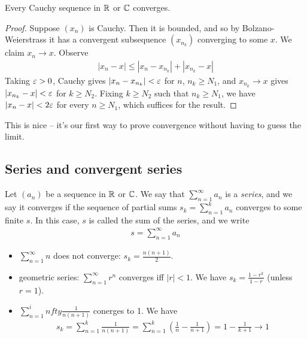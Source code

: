 \documentclass{../template/note}
\begin{document}
    \begin{theorem}
        Every Cauchy sequence in \(\mathbb R\) or \(\mathbb C\) converges.
    \end{theorem}
    
    \begin{proof}
        Suppose \((x_n)\) is Cauchy. Then it is bounded, and so by Bolzano-Weierstrass it has a convergent subsequence \((x_{n_k})\) converging to some \(x\). We claim \(x_n \to x\). Observe
        \begin{align*}
            |x_n - x| \leq |x_n - x_{n_k}| + |x_{n_k} - x|
        \end{align*}
        Taking \(\varepsilon > 0\), Cauchy gives \(|x_n - x_{n_k}| < \varepsilon\) for \(n\), \(n_k \geq N_1\), and \(x_{n_k} \to x\) gives \(|x_{n_k} - x| < \varepsilon\) for \(k \geq N_2\). Fixing \(k \geq N_2\) such that \(n_k \geq N_1\), we have \(|x_n - x| < 2\varepsilon\) for every \(n \geq N_1\), which suffices for the result.        
    \end{proof}
    
    \begin{remark*}
        This is nice -- it's our first way to prove convergence without having to guess the limit.
    \end{remark*}
    
    \subsection{Series and convergent series}

    \begin{definition}
        Let \((a_n)\) be a sequence in \(\mathbb R\) or \(\mathbb C\). We say that \(\sum_{n=1}^\infty a_n\) is a \emph{series}, and we say it converges if the sequence of partial sums \(s_k = \sum_{n=1}^k a_n\) converges to some finite \(s\). In this case, \(s\) is called the sum of the series, and we write
        \begin{align*}
            s = \sum_{n=1}^\infty a_n
        \end{align*}        
    \end{definition}
    
    \begin{example*}
        \begin{itemize}
            \item \(\sum_{n=1}^\infty n\) does not converge: \(s_k = \frac{n(n+1)}2\).
            \item geometric series: \(\sum_{n=1}^\infty r^n\) converges iff \(|r| < 1\). We have \(s_k = \frac{1-r^k}{1-r}\) (unless \(r=1\)).
            \item \(\sum_{n=1}^infty \frac{1}{n(n+1)}\) conerges to 1. We have
            \begin{align*}
                s_k = \sum_{n=1}^k \frac{1}{n(n+1)} = \sum_{n=1}^k \left(\frac 1 n - \frac 1 {n+1}\right) = 1 - \frac{1}{k+1} \to 1
            \end{align*}
        \end{itemize}
    \end{example*}
    
\end{document}
